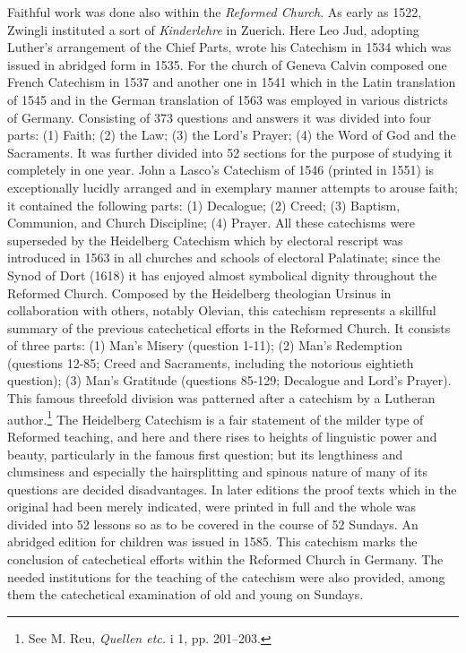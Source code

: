 Faithful work was done also within the \emph{Reformed Church}. As early as 1522, Zwingli instituted a sort of \emph{Kinderlehre} in Zuerich. Here Leo Jud, adopting Luther's arrangement of the Chief Parts, wrote his Catechism in 1534 which was issued in abridged form in 1535. For the church of Geneva Calvin composed one French Catechism in 1537 and another one in 1541 which in the Latin translation of 1545 and in the German translation of 1563 was employed in various districts of Germany. Consisting of 373 questions and answers it was divided into four parts: (1) Faith; (2) the Law; (3) the Lord's Prayer; (4) the Word of God and the Sacraments. It was further divided into 52 sections for the purpose of studying it completely in one year. John a Lasco's Catechism of 1546 (printed in 1551) is exceptionally lucidly arranged
 and in exemplary manner attempts to arouse faith; it contained the following parts: (1) Decalogue; (2) Creed; (3) Baptism, Communion, and Church Discipline; (4) Prayer. All these catechisms were superseded by the Heidelberg Catechism which by electoral rescript was introduced in 1563 in all churches and schools of electoral Palatinate; since the Synod of Dort (1618) it has enjoyed almost symbolical dignity throughout the Reformed Church. Composed by the Heidelberg theologian Ursinus in collaboration with others, notably Olevian, this catechism represents a skillful summary of the previous catechetical efforts in the Reformed Church. It consists of three parts: (1) Man’s Misery (question 1-11); (2) Man’s Redemption (questions 12-85; Creed and Sacraments, including the notorious eightieth question); (3) Man’s Gratitude (questions 85-129; Decalogue and Lord’s Prayer). This famous threefold division was patterned after a catechism by a Lutheran author.\footnote{See M. Reu, \emph{Quellen etc.} i 1, pp. 201–203.} The Heidelberg Catechism is a fair statement of the milder type of Reformed teaching, and here and there rises to heights of linguistic power and beauty, particularly in the famous first question; but its lengthiness and clumsiness and especially the hairsplitting and spinous nature of many of its questions are decided disadvantages. In later editions the proof texts which in the original had been merely indicated, were printed in full and the whole was divided into 52 lessons so as to be covered in the course of 52 Sundays. An abridged edition for children was issued in 1585. This catechism marks the conclusion of catechetical efforts within the Reformed Church in Germany. The needed institutions for the teaching of the catechism were also provided, among them the catechetical examination of old and young on Sundays.

